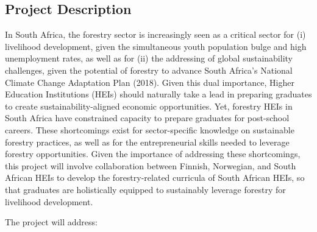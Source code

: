 \documentclass[
  11pt,
]{article}
\begin{document}
\hypertarget{project-description}{%
\subsection{Project Description}\label{project-description}}

In South Africa, the forestry sector is increasingly seen as a critical
sector for (i) livelihood development, given the simultaneous youth
population bulge and high unemployment rates, as well as for (ii) the
addressing of global sustainability challenges, given the potential of
forestry to advance South Africa's National Climate Change Adaptation
Plan (2018). Given this dual importance, Higher Education Institutions
(HEIs) should naturally take a lead in preparing graduates to create
sustainability-aligned economic opportunities. Yet, forestry HEIs in
South Africa have constrained capacity to prepare graduates for
post-school careers. These shortcomings exist for sector-specific
knowledge on sustainable forestry practices, as well as for the
entrepreneurial skills needed to leverage forestry opportunities. Given
the importance of addressing these shortcomings, this project will
involve collaboration between Finnish, Norwegian, and South African HEIs
to develop the forestry-related curricula of South African HEIs, so that
graduates are holistically equipped to sustainably leverage forestry for
livelihood development.

The project will address:
\end{document}
